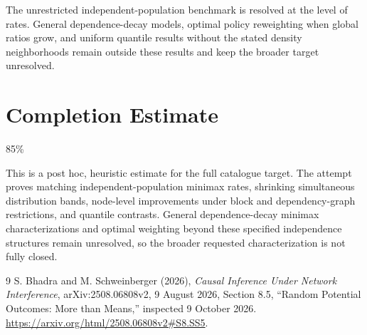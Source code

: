 \documentclass[11pt]{article}
\theoremstyle{remark}\newtheorem{remark}[theorem]{Remark}
\begin{document}
The unrestricted independent-population benchmark is resolved at the level of rates. General dependence-decay models, optimal policy reweighting when global ratios grow, and uniform quantile results without the stated density neighborhoods remain outside these results and keep the broader target unresolved.

\section{Completion Estimate}
85\%

This is a post hoc, heuristic estimate for the full catalogue target.
The attempt proves matching independent-population minimax rates, shrinking simultaneous distribution bands, node-level improvements under block and dependency-graph restrictions, and quantile contrasts. General dependence-decay minimax characterizations and optimal weighting beyond these specified independence structures remain unresolved, so the broader requested characterization is not fully closed.

\begin{thebibliography}{9}
 S. Bhadra and M. Schweinberger (2026), \emph{Causal Inference Under Network Interference}, arXiv:2508.06808v2, 9 August 2026, Section 8.5, ``Random Potential Outcomes: More than Means,'' inspected 9 October 2026. \url{https://arxiv.org/html/2508.06808v2#S8.SS5}.
\end{thebibliography}
\end{document}
